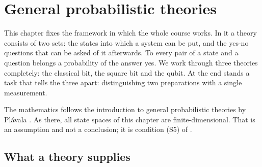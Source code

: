 %
%

\chapter{General probabilistic theories}\label{c02}

This chapter fixes the framework in which the whole course works. In it a theory consists
of two sets: the states into which a system can be put, and the yes-no questions that can
be asked of it afterwards. To every pair of a state and a question belongs a probability
of the answer yes. We work through three theories completely: the classical bit, the
square bit and the qubit. At the end stands a task that tells the three apart:
distinguishing two preparations with a single measurement.

The mathematics follows the introduction to general probabilistic theories by Plávala
.
As there, all state spaces of this chapter are finite-dimensional. That is an assumption
and not a conclusion; it is condition (S5) of .

\section{What a theory supplies}\label{c02.s1}

